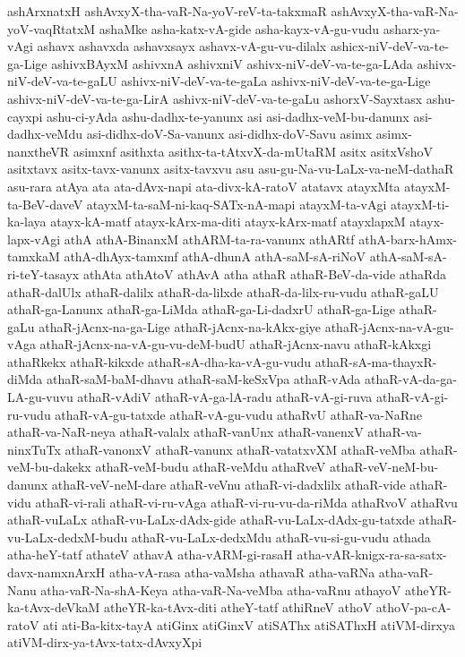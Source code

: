 {ashArxnatxH
ashAvxyX-tha-vaR-Na-yoV-reV-ta-takxmaR
ashAvxyX-tha-vaR-Na-yoV-vaqRtatxM
ashaMke
asha-katx-vA-gide
asha-kayx-vA-gu-vudu
asharx-ya-vAgi
ashavx
ashavxda
ashavxsayx
ashavx-vA-gu-vu-dilalx
ashicx-niV-deV-va-te-ga-Lige
ashivxBAyxM
ashivxnA
ashivxniV
ashivx-niV-deV-va-te-ga-LAda
ashivx-niV-deV-va-te-gaLU
ashivx-niV-deV-va-te-gaLa
ashivx-niV-deV-va-te-ga-Lige
ashivx-niV-deV-va-te-ga-LirA
ashivx-niV-deV-va-te-gaLu
ashorxV-Sayxtasx
ashu-cayxpi
ashu-ci-yAda
ashu-dadhx-te-yanunx
asi
asi-dadhx-veM-bu-danunx
asi-dadhx-veMdu
asi-didhx-doV-Sa-vanunx
asi-didhx-doV-Savu
asimx
asimx-nanxtheVR
asimxnf
asithxta
asithx-ta-tAtxvX-da-mUtaRM
asitx
asitxVshoV
asitxtavx
asitx-tavx-vanunx
asitx-tavxvu
asu
asu-gu-Na-vu-LaLx-va-neM-dathaR
asu-rara
atAya
ata
ata-dAvx-napi
ata-divx-kA-ratoV
atatavx
atayxMta
atayxM-ta-BeV-daveV
atayxM-ta-saM-ni-kaq-SATx-nA-mapi
atayxM-ta-vAgi
atayxM-ti-ka-laya
atayx-kA-matf
atayx-kArx-ma-diti
atayx-kArx-matf
atayxlapxM
atayx-lapx-vAgi
athA
athA-BinanxM
athARM-ta-ra-vanunx
athARtf
athA-barx-hAmx-tamxkaM
athA-dhAyx-tamxmf
athA-dhunA
athA-saM-sA-riNoV
athA-saM-sA-ri-teY-tasayx
athAta
athAtoV
athAvA
atha
athaR
athaR-BeV-da-vide
athaRda
athaR-dalUlx
athaR-dalilx
athaR-da-lilxde
athaR-da-lilx-ru-vudu
athaR-gaLU
athaR-ga-Lanunx
athaR-ga-LiMda
athaR-ga-Li-dadxrU
athaR-ga-Lige
athaR-gaLu
athaR-jAcnx-na-ga-Lige
athaR-jAcnx-na-kAkx-giye
athaR-jAcnx-na-vA-gu-vAga
athaR-jAcnx-na-vA-gu-vu-deM-budU
athaR-jAcnx-navu
athaR-kAkxgi
athaRkekx
athaR-kikxde
athaR-sA-dha-ka-vA-gu-vudu
athaR-sA-ma-thayxR-diMda
athaR-saM-baM-dhavu
athaR-saM-keSxVpa
athaR-vAda
athaR-vA-da-ga-LA-gu-vuvu
athaR-vAdiV
athaR-vA-ga-lA-radu
athaR-vA-gi-ruva
athaR-vA-gi-ru-vudu
athaR-vA-gu-tatxde
athaR-vA-gu-vudu
athaRvU
athaR-va-NaRne
athaR-va-NaR-neya
athaR-valalx
athaR-vanUnx
athaR-vanenxV
athaR-va-ninxTuTx
athaR-vanonxV
athaR-vanunx
athaR-vatatxvXM
athaR-veMba
athaR-veM-bu-dakekx
athaR-veM-budu
athaR-veMdu
athaRveV
athaR-veV-neM-bu-danunx
athaR-veV-neM-dare
athaR-veVnu
athaR-vi-dadxlilx
athaR-vide
athaR-vidu
athaR-vi-rali
athaR-vi-ru-vAga
athaR-vi-ru-vu-da-riMda
athaRvoV
athaRvu
athaR-vuLaLx
athaR-vu-LaLx-dAdx-gide
athaR-vu-LaLx-dAdx-gu-tatxde
athaR-vu-LaLx-dedxM-budu
athaR-vu-LaLx-dedxMdu
athaR-vu-si-gu-vudu
athada
atha-heY-tatf
athateV
athavA
atha-vARM-gi-rasaH
atha-vAR-knigx-ra-sa-satx-davx-namxnArxH
atha-vA-rasa
atha-vaMsha
athavaR
atha-vaRNa
atha-vaR-Nanu
atha-vaR-Na-shA-Keya
atha-vaR-Na-veMba
atha-vaRnu
athayoV
atheYR-ka-tAvx-deVkaM
atheYR-ka-tAvx-diti
atheY-tatf
athiRneV
athoV
athoV-pa-cA-ratoV
ati
ati-Ba-kitx-tayA
atiGinx
atiGinxV
atiSAThx
atiSAThxH
atiVM-dirxya
atiVM-dirx-ya-tAvx-tatx-dAvxyXpi
}
